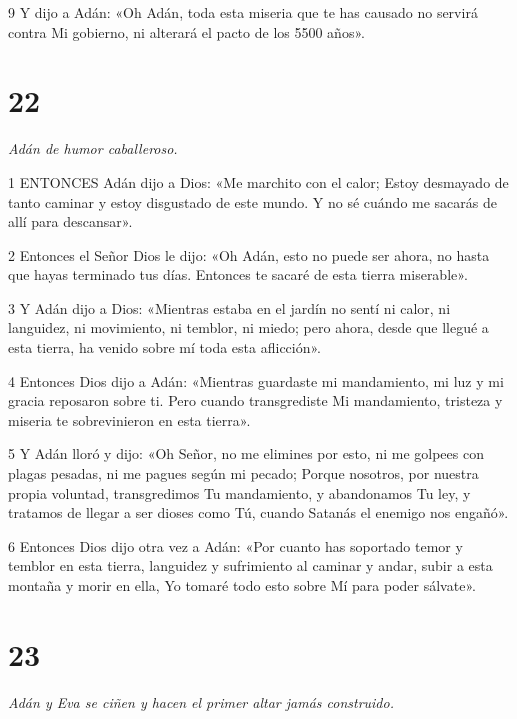 \par 9 Y dijo a Adán: «Oh Adán, toda esta miseria que te has causado no servirá contra Mi gobierno, ni alterará el pacto de los 5500 años».

\chapter{22}

\par \textit{Adán de humor caballeroso.}

\par 1 ENTONCES Adán dijo a Dios: «Me marchito con el calor; Estoy desmayado de tanto caminar y estoy disgustado de este mundo. Y no sé cuándo me sacarás de allí para descansar».

\par 2 Entonces el Señor Dios le dijo: «Oh Adán, esto no puede ser ahora, no hasta que hayas terminado tus días. Entonces te sacaré de esta tierra miserable».

\par 3 Y Adán dijo a Dios: «Mientras estaba en el jardín no sentí ni calor, ni languidez, ni movimiento, ni temblor, ni miedo; pero ahora, desde que llegué a esta tierra, ha venido sobre mí toda esta aflicción».

\par 4 Entonces Dios dijo a Adán: «Mientras guardaste mi mandamiento, mi luz y mi gracia reposaron sobre ti. Pero cuando transgrediste Mi mandamiento, tristeza y miseria te sobrevinieron en esta tierra».

\par 5 Y Adán lloró y dijo: «Oh Señor, no me elimines por esto, ni me golpees con plagas pesadas, ni me pagues según mi pecado; Porque nosotros, por nuestra propia voluntad, transgredimos Tu mandamiento, y abandonamos Tu ley, y tratamos de llegar a ser dioses como Tú, cuando Satanás el enemigo nos engañó».

\par 6 Entonces Dios dijo otra vez a Adán: «Por cuanto has soportado temor y temblor en esta tierra, languidez y sufrimiento al caminar y andar, subir a esta montaña y morir en ella, Yo tomaré todo esto sobre Mí para poder sálvate».

\chapter{23}

\par \textit{Adán y Eva se ciñen y hacen el primer altar jamás construido.}

